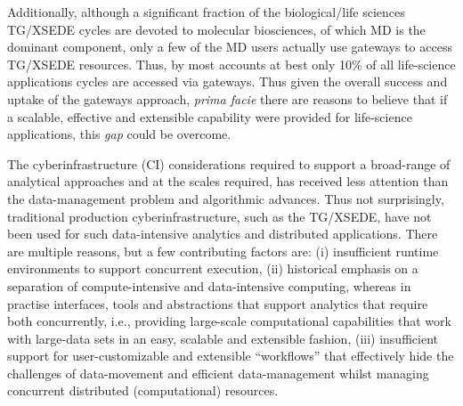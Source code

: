 \documentclass[]{svjour3}
\begin{document}
Additionally, although a significant fraction of the biological/life
sciences TG/XSEDE cycles are devoted to molecular biosciences, of
which MD is the dominant component, only a few of the MD users
actually use gateways to access TG/XSEDE resources. Thus, by most accounts
at best only 10\% of all life-science applications cycles are accessed
via gateways.  %
Thus given the overall success and uptake of the gateways approach,
{\it prima facie} there are reasons to believe that if a scalable,
effective and extensible capability were provided for life-science
applications, this {\it gap} could be overcome.


 

The cyberinfrastructure (CI) considerations required to support a
broad-range of analytical approaches and at the scales required, has
received less attention than the data-management problem and
algorithmic advances. Thus not surprisingly, traditional production
cyberinfrastructure, such as the TG/XSEDE, have not been used for such
data-intensive analytics and distributed applications. There are
multiple reasons, but a few contributing factors are: (i) insufficient
runtime environments to support concurrent execution, (ii) historical
emphasis on a separation of compute-intensive and data-intensive
computing, whereas in practise interfaces, tools and abstractions that
support analytics that require both concurrently, i.e., providing
large-scale computational capabilities that work with large-data sets
in an easy, scalable and extensible fashion, (iii) insufficient
support for user-customizable and extensible ``workflows'' that
effectively hide the challenges of data-movement and efficient
data-management whilst managing concurrent distributed (computational)
resources.
\end{document}
